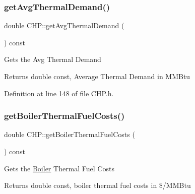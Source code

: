 \mbox{\label{class_c_h_p_a5f8975488324e4aa3517c9e01334f4bf}} 
\subsubsection{\texorpdfstring{get\+Avg\+Thermal\+Demand()}{getAvgThermalDemand()}\hspace{0.1cm}{\footnotesize\ttfamily [3/3]}}
{\footnotesize\ttfamily double C\+H\+P\+::get\+Avg\+Thermal\+Demand (\begin{DoxyParamCaption}{ }\end{DoxyParamCaption}) const\hspace{0.3cm}{\ttfamily [inline]}}

Gets the Avg Thermal Demand

\begin{DoxyReturn}{Returns}
double const, Average Thermal Demand in M\+M\+Btu 
\end{DoxyReturn}


Definition at line 148 of file C\+H\+P.\+h.

\mbox{\label{class_c_h_p_a9f6c6638b1be7c2df8ba4b406c3b2b94}} 
\subsubsection{\texorpdfstring{get\+Boiler\+Thermal\+Fuel\+Costs()}{getBoilerThermalFuelCosts()}\hspace{0.1cm}{\footnotesize\ttfamily [1/3]}}
{\footnotesize\ttfamily double C\+H\+P\+::get\+Boiler\+Thermal\+Fuel\+Costs (\begin{DoxyParamCaption}{ }\end{DoxyParamCaption}) const\hspace{0.3cm}{\ttfamily [inline]}}

Gets the \hyperlink{class_boiler}{Boiler} Thermal Fuel Costs

\begin{DoxyReturn}{Returns}
double const, boiler thermal fuel costs in \$/\+M\+M\+Btu 
\end{DoxyReturn}


